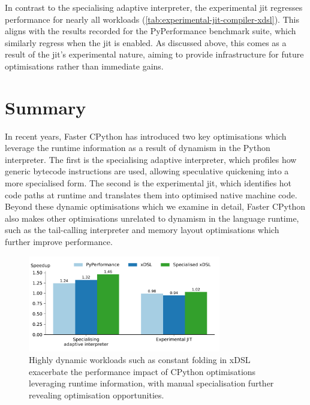 In contrast to the specialising adaptive interpreter, the experimental \ac{jit} regresses performance for nearly all workloads (\autoref{tab:experimental-jit-compiler-xdsl}).
This aligns with the results recorded for the PyPerformance benchmark suite, which similarly regress when the \ac{jit} is enabled.
As discussed above, this comes as a result of the \ac{jit}'s experimental nature, aiming to provide infrastructure for future optimisations rather than immediate gains.



\section{Summary}
\label{chap:impact-cpython-pattern-summary}

In recent years, Faster CPython has introduced two key optimisations which leverage the runtime information as a result of dynamism in the Python interpreter.
The first is the specialising adaptive interpreter, which profiles how generic bytecode instructions are used, allowing speculative quickening into a more specialised form. The second is the experimental \ac{jit}, which identifies hot code paths at runtime and translates them into optimised native machine code.
Beyond these dynamic optimisations which we examine in detail, Faster CPython also makes other optimisations unrelated to dynamism in the language runtime, such as the tail-calling interpreter \cite{joshhabermanTailCallingInterpreter2025} and memory layout optimisations which further improve performance.

\begin{figure}[H]
    \centering
    \includegraphics[width=0.75\textwidth]{images/impact_cpython_optimisations/15_summary.pdf}
    \caption{Highly dynamic workloads such as constant folding in xDSL exacerbate the performance impact of CPython optimisations leveraging runtime information, with manual specialisation further revealing optimisation opportunities.}
    \label{figure:impact-cpython-optimisations}
\end{figure}


